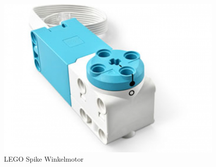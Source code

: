 \begin{figure}[H]
	\centering
	\includegraphics[width=0.4\linewidth]{images/Motor}
	\caption[LEGO Spike Winkelmotor Quelle:\autocite{legoeducation2020spikesensors}]{LEGO Spike Winkelmotor}
	\label{fig:motor}
\end{figure}

